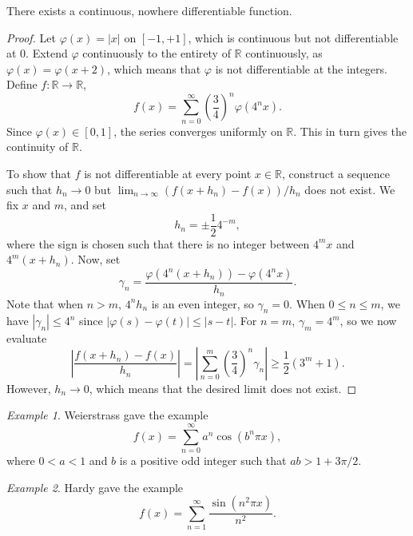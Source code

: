 \documentclass[11pt]{article}
\def\R{\mathbb{R}}
\theoremstyle{definition}
\theoremstyle{remark}
\newtheorem*{example}{Example}
\numberwithin{equation}{module}
\begin{document}
    \begin{theorem}
        There exists a continuous, nowhere differentiable function.
    \end{theorem}
    \begin{proof}
        Let $\varphi(x) = |x|$ on $[-1, +1]$, which is continuous but not
        differentiable at $0$. Extend $\varphi$ continuously to the entirety of $\R$
        continuously, as $\varphi(x) = \varphi(x + 2)$, which means that $\varphi$
        is not differentiable at the integers. Define $f\colon \R \to \R$, \[
            f(x) = \sum_{n = 0}^\infty \left( \frac{3}{4} \right)^n\varphi(4^n x).
        \] Since $\varphi(x) \in [0, 1]$, the series converges uniformly on $\R$.
        This in turn gives the continuity of $\R$.

        To show that $f$ is not differentiable at every point $x \in \R$, construct a 
        sequence such that $h_n \to 0$ but $\lim_{n \to \infty} (f(x + h_n) - f(x)) / 
        h_n$ does not exist. We fix $x$ and $m$, and set \[
            h_n = \pm\frac{1}{2}4^{-m},
        \] where the sign is chosen such that there is no integer between $4^mx$ and
        $4^m(x + h_n)$. Now, set \[
            \gamma_n = \frac{\varphi(4^n(x + h_n)) - \varphi(4^nx)}{h_n}.
        \] Note that when $n > m$, $4^nh_n$ is an even integer, so $\gamma_n = 0$.
        When $0 \leq n \leq m$, we have $|\gamma_n| \leq 4^n$ since $|\varphi(s) -
        \varphi(t)| \leq |s - t|$. For $n = m$, $\gamma_m = 4^m$, so we now evaluate
        \[
            \left|\frac{f(x + h_n) - f(x)}{h_n}\right| = \left|\sum_{n = 0}^m
            \left(\frac{3}{4}\right)^n \gamma_n\right| \geq \frac{1}{2}(3^m + 1).
        \] However, $h_n \to 0$, which means that the desired limit does not exist.
    \end{proof}
    \begin{example}
        Weierstrass gave the example \[
            f(x) = \sum_{n = 0}^\infty a^n\cos(b^n\pi x),
        \] where $0 < a < 1$ and $b$ is a positive odd integer such that $ab > 1 +
        3\pi / 2$.
    \end{example}
    \begin{example}
        Hardy gave the example \[
            f(x) = \sum_{n = 1}^\infty \frac{\sin(n^2\pi x)}{n^2}.
        \] 
    \end{example}
\end{document}
